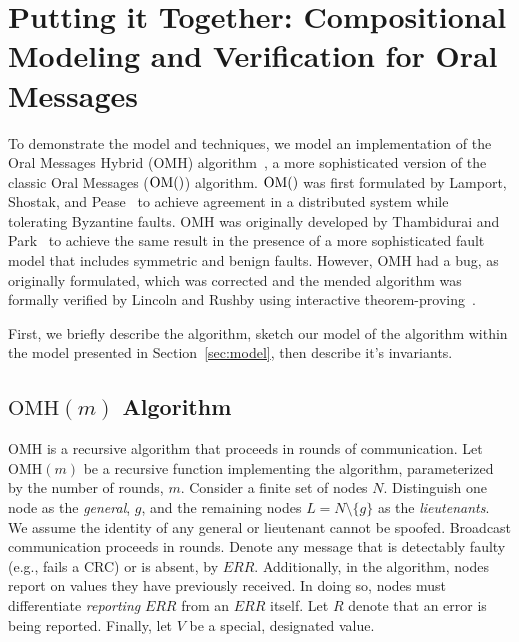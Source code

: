 \documentclass{llncs/llncs}
\newcommand{\OM}[1]{\ensuremath{\mathrm{OM}(#1)}}
\newcommand{\OMH}{\ensuremath{\mathrm{OMH}}}
\newcommand{\ben}[1]{ } %
\newcommand{\ben}[1]{ {\color{purple}$<$ben: #1$>$} } %
\begin{document}

\section{Putting it Together: Compositional Modeling and Verification for Oral Messages}\label{sec:byz}

To demonstrate the model and techniques, we model an implementation of the Oral Messages Hybrid ($\OMH$) algorithm~\cite{csl-93-2}, a more sophisticated version of the classic Oral Messages ($\OM$) algorithm. $\OM$ was first formulated by Lamport, Shostak, and Pease~\cite{om} to achieve agreement in a distributed system while tolerating Byzantine faults. $\OMH$ was originally developed by Thambidurai and Park~\cite{hybrid} to achieve the same result in the presence of a more sophisticated fault model that includes symmetric and benign faults. However, $\OMH$ had a bug, as originally formulated, which was corrected and the mended algorithm was formally verified by Lincoln and Rushby using interactive theorem-proving~\cite{csl-93-2}.

First, we briefly describe the algorithm, sketch our model of the algorithm within the model presented in Section~\ref{sec:model}, then describe it's invariants.

\ben{The word "model" is very overloaded in the paper so far. I wonder if we could use a different word like "modeling framework", or something more concise, for the one conotation and just "model" for the concrete mathematical description of a particular system?}

\subsection{$\OMH(m)$ Algorithm}
$\OMH$ is a recursive algorithm that proceeds in rounds of communication. Let $\OMH(m)$ be a recursive function implementing the algorithm, parameterized by the number of rounds, $m$. Consider a finite set of nodes $N$. Distinguish one node as the \emph{general}, $g$, and the remaining nodes $L = N \setminus \{g\}$ as the \emph{lieutenants}. We assume the identity of any general or lieutenant cannot be spoofed. Broadcast communication proceeds in rounds. Denote any message that is detectably faulty (e.g., fails a CRC) or is absent, by $ERR$. Additionally, in the algorithm, nodes report on values they have previously received. In doing so, nodes must differentiate \emph{reporting} $ERR$ from an $ERR$ itself. Let $R$ denote that an error is being reported. Finally, let $V$ be a special, designated value.
\end{document}
